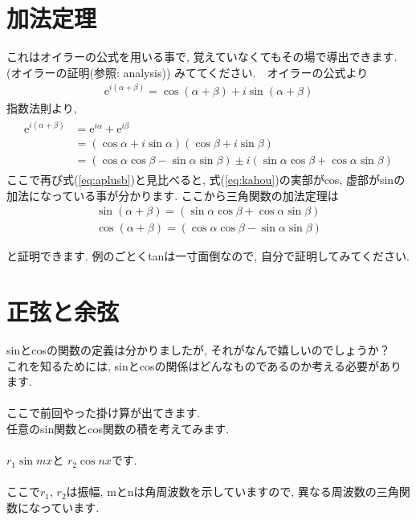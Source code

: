 \documentclass[11pt,a4paper]{jreport}
\begin{document}
\section{加法定理\label{addition_theorem}}
これはオイラーの公式を用いる事で, 覚えていなくてもその場で導出できます. (オイラーの証明(参照: analysis)) みててください.　オイラーの公式より
\begin{eqnarray}
\mathrm{e}^{i(\alpha + \beta)} = \cos (\alpha + \beta) + i\sin (\alpha + \beta)
\label{eq:aplusb}
\end{eqnarray}
指数法則より,
\begin{eqnarray}
\begin{split}
\mathrm{e}^{i(\alpha + \beta)} &= \mathrm{e}^{i\alpha} + \mathrm{e}^{i\beta} \\ &= (\cos \alpha + i\sin\alpha)(\cos\beta + i\sin\beta) \\
&= (\cos\alpha\cos\beta - \sin\alpha\sin\beta)\pm i(\sin\alpha\cos\beta + \cos\alpha\sin\beta)
\end{split}
\label{eq:kahou}
\end{eqnarray}
ここで再び式(\ref{eq:aplusb})と見比べると, 式(\ref{eq:kahou})の実部がcos, 虚部がsinの加法になっている事が分かります. ここから三角関数の加法定理は
\begin{eqnarray}
\sin (\alpha + \beta) = (\sin\alpha\cos\beta + \cos\alpha\sin\beta)\\
\cos (\alpha + \beta) = (\cos\alpha\cos\beta - \sin\alpha\sin\beta)
\label{kahouteiri}
\end{eqnarray}

と証明できます. 例のごとくtanは一寸面倒なので, 自分で証明してみてください.
\section{正弦と余弦}
sinとcosの関数の定義は分かりましたが, それがなんで嬉しいのでしょうか？\\
これを知るためには, sinとcosの関係はどんなものであるのか考える必要があります.\\
\\
ここで前回やった掛け算が出てきます. \\
任意のsin関数とcos関数の積を考えてみます.\\
\\
$r_1\sin mx $と $r_2\cos nx $です.\\
\\
ここで$r_1$, $r_2$は振幅, mとnは角周波数を示していますので, 異なる周波数の三角関数になっています.\\
\end{document}
